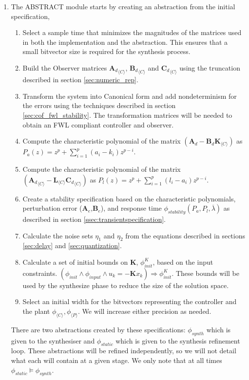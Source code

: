 \documentclass[sigconf]{llncs}
\newcommand{\mat}[1]{\boldsymbol{#1}}
\begin{document}
\begin{enumerate}
\item 
The {\sc ABSTRACT} module starts by creating an abstraction from the initial specification,
\begin{enumerate}
\item Select a sample time that minimizes the magnitudes of the matrices used in both the
implementation and the abstraction. This ensures that a small bitvector size is required for
the synthesis process.
\item Build the Observer matrices ${\mat{A}_d}_{\langle C \rangle}$, ${\mat{B}_d}_{\langle C \rangle}$
and ${\mat{C}_d}_{\langle C \rangle}$ using the truncation described in section \ref{sec:numeric_rep}.
\item Transform the system into Canonical form and add nondeterminism for the errors
using the techniques described in section \ref{sec:cof_fwl_stability}. The transformation
matrices will be needed to obtain an FWL compliant controller and observer.
\item Compute the characteristic polynomial of the matrix $(\mat{A}_d-\mat{B}_d\mat{K}_{\langle C \rangle})$
as $P_a(z) = z^p+\sum_{i=1}^p{(a_i-k_i)z^{p-i}}$. 
\item Compute the characteristic polynomial of the matrix $({\mat{A}_d}_{\langle C \rangle}-\mat{L}_{\langle C \rangle}{\mat{C}_d}_{\langle C \rangle})$
as $P_l(z) = z^p+\sum_{i=1}^p{(l_i-a_i)z^{p-i}}$. 
\item Create a stability specification based on the characteristic polynomials, perturbation
error ($\mat{A}_e$,$\mat{B}_e$), and response time $\phi_{stability}(P_a,P_l,\overline{\lambda})$
as described in section \ref{ssec:transientspecification}.
\item Calculate the noise sets $\eta_1$ and $\eta_2$ from the equations
described in sections \ref{sec:delay} and \ref{sec:quantization}.
\item Calculate a set of initial bounds on $\mat{K}$, $\phi_\mathit{init}^{K}$,
based on the input constraints.
%
$(\phi_\mathit{init} \wedge \phi_\mathit{input} \wedge u_k=-\mat{K} x_k)
\Rightarrow \phi_\mathit{init}^{K}$.
These bounds will be used by the {\sc synthesize} phase to reduce the size of the solution space. 
\item Select an initial width for the bitvectors representing the controller and the plant $\phi_{\langle C \rangle}, \phi_{\langle P \rangle}$. We will increase either precision as needed.
\end{enumerate}
There are two abstractions created by these specifications: $\phi_{synth}$ which is given to the synthesiser and $\phi_{static}$ which is given to the synthesis refinement loop. These abstractions will be refined independently, so we will not detail what each will contain at a given stage. We only note that at all times $\phi_{static} \models \phi_{synth}$.


\end{enumerate}
\end{document}
